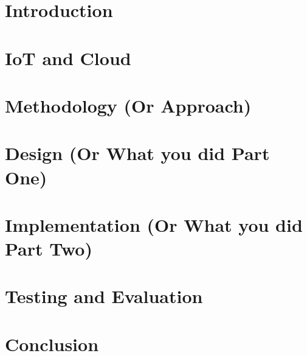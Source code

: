 \documentclass[12pt,oneside]{report}
\begin{document}






\tableofcontents




\chapter{Introduction}


\chapter{IoT and Cloud}


\chapter{Methodology (Or Approach)}


\chapter{Design (Or What you did Part One)}


\chapter{Implementation (Or What you did Part Two)}


\chapter{Testing and Evaluation}


\chapter{Conclusion}



% 
% 
% 

\end{document}
